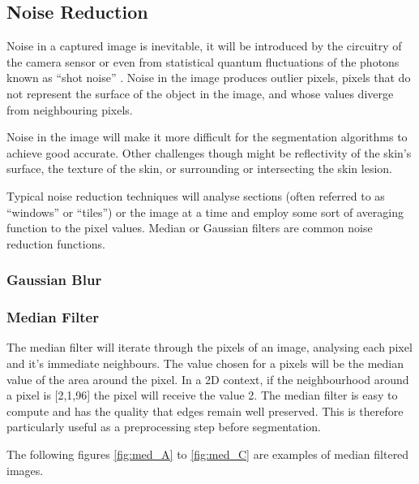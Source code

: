 \subsection{Noise Reduction}

Noise in a captured image is inevitable, it will be introduced by the circuitry of the camera sensor or even from statistical quantum fluctuations of the photons known as “shot noise” \cite{image_noise}.  Noise in the image produces outlier pixels, pixels that do not represent the surface of the object in the image, and whose values diverge from neighbouring pixels.

Noise in the image will make it more difficult for the segmentation algorithms to achieve good accurate. Other challenges though might be reflectivity of the skin’s surface, the texture of the skin, or surrounding or intersecting the skin lesion.

Typical noise reduction techniques will analyse sections (often referred to as “windows” or “tiles”) or the image at a time and employ some sort of averaging function to the pixel values. Median or Gaussian filters are common noise reduction functions.

\subsubsection{Gaussian Blur}


\subsubsection{Median Filter}

The median filter will iterate through the pixels of an image, analysing each pixel and it's immediate neighbours. The value chosen for a pixels will be the median value of the area around the pixel. In a 2D context, if the neighbourhood around a pixel is [2,1,96] the pixel will receive the value 2. The median filter is easy to compute and has the quality that edges remain well preserved. This is therefore particularly useful as a preprocessing step before segmentation.

The following figures \ref{fig:med_A} to \ref{fig:med_C} are examples of median filtered images.

